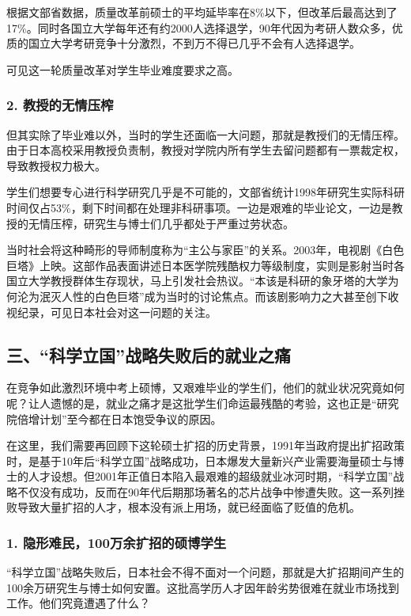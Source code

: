 根据文部省数据，质量改革前硕士的平均延毕率在8\%以下，但改革后最高达到了17\%。同时各国立大学每年还有约2000人选择退学，90年代因为考研人数众多，优质的国立大学考研竞争十分激烈，不到万不得已几乎不会有人选择退学。

可见这一轮质量改革对学生毕业难度要求之高。

\subsubsection{2. 教授的无情压榨}

但其实除了毕业难以外，当时的学生还面临一大问题，那就是教授们的无情压榨。由于日本高校采用教授负责制，教授对学院内所有学生去留问题都有一票裁定权，导致教授权力极大。

学生们想要专心进行科学研究几乎是不可能的，文部省统计1998年研究生实际科研时间仅占53\%，剩下时间都在处理非科研事项。一边是艰难的毕业论文，一边是教授的无情压榨，研究生与博士们几乎都处于严重过劳状态。

当时社会将这种畸形的导师制度称为“主公与家臣”的关系。2003年，电视剧《白色巨塔》上映。这部作品表面讲述日本医学院残酷权力等级制度，实则是影射当时各国立大学教授群体生存现状，马上引发社会热议。“本该是科研的象牙塔的大学为何沦为泯灭人性的白色巨塔”成为当时的讨论焦点。而该剧影响力之大甚至创下收视纪录，可见日本社会对这一问题的关注。

\subsection{三、“科学立国”战略失败后的就业之痛}

在竞争如此激烈环境中考上硕博，又艰难毕业的学生们，他们的就业状况究竟如何呢？让人遗憾的是，就业之痛才是这批学生们命运最残酷的考验，这也正是“研究院倍增计划”至今都在日本饱受争议的原因。

在这里，我们需要再回顾下这轮硕士扩招的历史背景，1991年当政府提出扩招政策时，是基于10年后“科学立国”战略成功，日本爆发大量新兴产业需要海量硕士与博士的人才设想。但2001年正值日本陷入最艰难的超级就业冰河时期，“科学立国”战略不仅没有成功，反而在90年代后期那场著名的芯片战争中惨遭失败。这一系列挫败导致大量扩招的人才，根本没有派上用场，就已经面临了贬值的危机。

\subsubsection{1. 隐形难民，100万余扩招的硕博学生}

“科学立国”战略失败后，日本社会不得不面对一个问题，那就是大扩招期间产生的100余万研究生与博士如何安置。这批高学历人才因年龄劣势很难在就业市场找到工作。他们究竟遭遇了什么？

